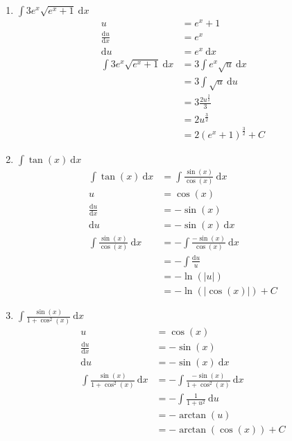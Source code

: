 \documentclass[10pt]{article}
\begin{document}
\begin{enumerate}[start=5,leftmargin=1in]
\begin{enumerate}
        \item $\int 3 e^x \sqrt{e^x + 1} \: \text{d}x$ 
        \begin{align*}
            u &= e^x + 1 \\
            \frac{\text{d}u}{\text{d}x} &= e^x \\
            \text{d}u &= e^x \: \text{d}x \\
            \int 3 e^x \sqrt{e^x + 1} \: \text{d}x &= 3 \int e^x \sqrt{u} \: \text{d}x \\
            &= 3 \int \sqrt{u} \: \text{d}u \\
            &= 3 \frac{2 u^{\frac{3}{2}}}{3} \\
            &= 2 u^{\frac{3}{2}} \\
            &= 2 (e^x + 1)^{\frac{3}{2}} + C
        \end{align*}

        \item $\int \tan(x) \: \text{d}x$
        \begin{align*}
            \int \tan(x) \: \text{d}x &= \int \frac{\sin(x)}{\cos(x)} \: \text{d}x \\
            u &= \cos(x) \\
            \frac{\text{d}u}{\text{d}x} &= - \sin(x) \\
            \text{d}u &= - \sin(x) \: \text{d}x \\
            \int \frac{\sin(x)}{\cos(x)} \: \text{d}x &= - \int \frac{- \sin(x)}{\cos(x)} \: \text{d}x \\
            &= - \int \frac{\text{d}u}{u} \: \\
            &= - \ln(|u|) \\
            &= - \ln(|\cos(x)|) + C
        \end{align*}

        \item $\int \frac{\sin(x)}{1 + \cos^2(x)} \: \text{d}x$
        \begin{align*}
            u &= \cos(x) \\
            \frac{\text{d}u}{\text{d}x} &= - \sin(x) \\
            \text{d}u &= - \sin(x) \: \text{d}x \\
            \int \frac{\sin(x)}{1 + \cos^2(x)} \: \text{d}x &= - \int \frac{- \sin(x)}{1 + \cos^2(x)} \: \text{d}x \\
            &= - \int \frac{1}{1 + u^2} \: \text{d}u \\
            &= - \arctan(u) \\
            &= - \arctan(\cos(x)) + C
        \end{align*}


\end{enumerate}
\end{enumerate}
\end{document}
